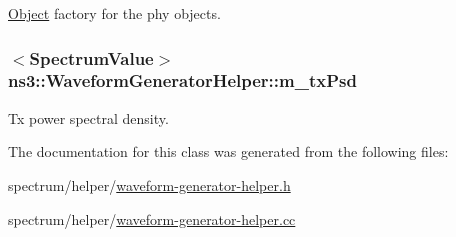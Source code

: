 \hyperlink{classns3_1_1Object}{Object} factory for the phy objects. 

\subsubsection[{\texorpdfstring{m\+\_\+tx\+Psd}{m_txPsd}}]{$<${\bf Spectrum\+Value}$>$ ns3\+::\+Waveform\+Generator\+Helper\+::m\+\_\+tx\+Psd\hspace{0.3cm}{\ttfamily [protected]}}\hypertarget{classns3_1_1WaveformGeneratorHelper_a2e645dbbbd5e8fded03836693993fdfa}{}\label{classns3_1_1WaveformGeneratorHelper_a2e645dbbbd5e8fded03836693993fdfa}


Tx power spectral density. 



The documentation for this class was generated from the following files\+:\begin{DoxyCompactItemize}
\item 
spectrum/helper/\hyperlink{waveform-generator-helper_8h}{waveform-\/generator-\/helper.\+h}\item 
spectrum/helper/\hyperlink{waveform-generator-helper_8cc}{waveform-\/generator-\/helper.\+cc}\end{DoxyCompactItemize}

